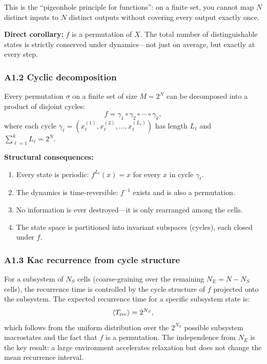 \documentclass[reprint]{revtex4-2}
\begin{document}
This is the ``pigeonhole principle for functions'': on a finite set, you cannot map $N$ distinct inputs to $N$ distinct outputs without covering every output exactly once.

\textbf{Direct corollary:} $f$ is a permutation of $X$. The total number of distinguishable states is strictly conserved under dynamics---not just on average, but exactly at every step.

\subsubsection{A1.2 Cyclic decomposition}

Every permutation $\sigma$ on a finite set of size $M=2^N$ can be decomposed into a product of disjoint cycles:
\begin{equation}
f = \gamma_1 \circ \gamma_2 \circ \cdots \circ \gamma_k,
\end{equation}
where each cycle $\gamma_\ell = (x_\ell^{(1)}, x_\ell^{(2)}, \ldots, x_\ell^{(L_\ell)})$ has length $L_\ell$ and $\sum_{\ell=1}^k L_\ell = 2^N$.

\textbf{Structural consequences:}
\begin{enumerate}[label=(\roman*)]
\item Every state is periodic: $f^{L_\ell}(x) = x$ for every $x$ in cycle $\gamma_\ell$.
\item The dynamics is time-reversible: $f^{-1}$ exists and is also a permutation.
\item No information is ever destroyed---it is only rearranged among the cells.
\item The state space is partitioned into invariant subspaces (cycles), each closed under $f$.
\end{enumerate}

\subsubsection{A1.3 Kac recurrence from cycle structure}

For a subsystem of $N_S$ cells (coarse-graining over the remaining $N_E=N-N_S$ cells), the recurrence time is controlled by the cycle structure of $f$ projected onto the subsystem. The expected recurrence time for a specific subsystem state is:
\begin{equation}
\langle T_{\rm rec}\rangle = 2^{N_S},
\end{equation}
which follows from the uniform distribution over the $2^{N_S}$ possible subsystem macrostates and the fact that $f$ is a permutation. The independence from $N_E$ is the key result: a large environment accelerates relaxation but does not change the mean recurrence interval.
\end{document}
